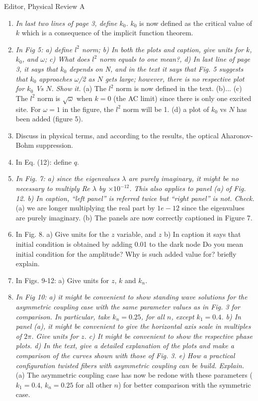 \documentclass[11pt]{letter}
\begin{document}
\begin{letter}{Editor, Physical Review A}
\begin{enumerate}
\item \emph{In last two lines of page 3, define $k_0$.} $k_0$ is now defined as the critical value of $k$ which is a consequence of the implicit function theorem.

\item \emph{In Fig 5: a) define $l^2$ norm; b) In both the plots and caption, give units for $k$, $k_0$, and $\omega$; c) What does $l^2$ norm equals to one mean?, d) In last line of page 3, it says that $k_0$ depends on N, and in the text it says that Fig. 5 suggests that $k_0$ approaches $\omega$/2 as $N$ gets large; however, there is no respective plot for $k_0$ Vs $N$. Show it.} (a) The $l^2$ norm is now defined in the text. (b)... (c) The $l^2$ norm is $\sqrt{\omega}$ when $k = 0$ (the AC limit) since there is only one excited site. For $\omega = 1$ in the figure, the $l^2$ norm will be 1. (d) a plot of $k_0$ vs $N$ has been added (figure 5).

\item Discuss in physical terms, and according to the results, the optical Aharonov-Bohm suppression.

\item In Eq. (12): define $q$.

\item \emph{In Fig. 7: a) since the eigenvalues $\lambda$ are purely imaginary, it might be no necessary to multiply Re $\lambda$ by $\times10^{-12}$. This also applies to panel (a) of Fig. 12. b) In caption, ``left panel'' is referred twice but ``right panel'' is not. Check.} (a) we are longer multiplying the real part by $1e-12$ since the eigenvalues are purely imaginary. (b) The panels are now correctly captioned in Figure 7.

\item In Fig. 8. a) Give units for the $z$ variable, and $z$ b) In caption it says that initial condition is obtained by adding 0.01 to the dark node Do you mean initial condition for the amplitude? Why is such added value for? briefly explain.

\item In Figs. 9-12: a) Give units for $z$, $k$ and $k_n$.

\item \emph{In Fig 10: a) it might be convenient to show standing wave solutions for the asymmetric coupling case with the same parameter values as in Fig. 3 for comparison. In particular, take $k_n=0.25$, for all $n$, except $k_1=0.4$. b) In panel (a), it might be convenient to give the horizontal axis scale in multiples of $2\pi$. Give units for $z$. c) It might be convenient to show the respective phase plots. d) In the text, give a detailed explanation of the plots and make a comparison of the curves shown with those of Fig. 3. e) How a practical configuration twisted fibers with asymmetric coupling can be build. Explain.} (a) The asymmetric coupling case has now be redone with these parameters ($k_1 = 0.4$, $k_n=0.25$ for all other $n$) for better comparison with the symmetric case.


\end{enumerate}
\end{letter}
\end{document}
